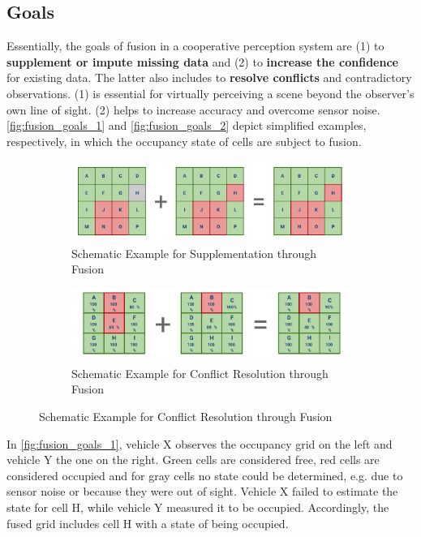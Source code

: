 \subsection{Goals}
\label{subsec:concept_design:fusion_goals}
Essentially, the goals of fusion in a cooperative perception system are (1) to \textbf{supplement or impute missing data} and (2) to \textbf{increase the confidence} for existing data. The latter also includes to \textbf{resolve conflicts} and contradictory observations. (1) is essential for virtually perceiving a scene beyond the observer's own line of sight. (2) helps to increase accuracy and overcome sensor noise. \autoref{fig:fusion_goals_1} and \autoref{fig:fusion_goals_2} depict simplified examples, respectively, in which the occupancy state of cells are subject to fusion.
\par
\bigskip

\begin{figure}[h]
	\centering
	\begin{subfigure}[b]{1\textwidth}
		\includegraphics[width=0.9\linewidth]{98_images/fusion_goals_ex1}
		\caption{Schematic Example for Supplementation through Fusion}
		\label{fig:fusion_goals_1}
	\end{subfigure}
	
	\begin{subfigure}[b]{1\textwidth}
		\includegraphics[width=0.89\linewidth]{98_images/fusion_goals_ex2}
		\caption{Schematic Example for Conflict Resolution through Fusion}
		\label{fig:fusion_goals_2}
	\end{subfigure}
\end{figure}

In \autoref{fig:fusion_goals_1}, vehicle X observes the occupancy grid on the left and vehicle Y the one on the right. Green cells are considered free, red cells are considered occupied and for gray cells no state could be determined, e.g. due to sensor noise or because they were out of sight. Vehicle X failed to estimate the state for cell H, while vehicle Y measured it to be occupied. Accordingly, the fused grid includes cell H with a state of being occupied.

